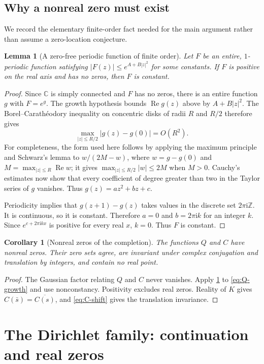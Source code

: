 \documentclass[11pt,a4paper]{article}
\numberwithin{equation}{section}
\newtheorem{lemma}[lemma]{Lemma}
\newtheorem{corollary}[corollary]{Corollary}
\theoremstyle{definition}
\theoremstyle{remark}
\newcommand{\C}{\mathbb C}
\newcommand{\Z}{\mathbb Z}
\newcommand{\ii}{\mathrm i}
\newcommand{\Rea}{\operatorname{Re}}
\newcommand{\abs}[1]{\left|#1\right|}
\begin{document}
\subsection{Why a nonreal zero must exist}
We record the elementary finite-order fact needed for the main
argument rather than assume a zero-location conjecture.

\begin{lemma}[A zero-free periodic function of finite order]
\label{lem:periodic-zero}
Let $F$ be an entire, $1$-periodic function satisfying
$\abs{F(z)}\le e^{A+B\abs z^2}$ for some constants. If $F$ is
positive on the real axis and has no zeros, then $F$ is constant.
\end{lemma}
\begin{proof}
Since $\C$ is simply connected and $F$ has no zeros, there is an
entire function $g$ with $F=e^g$. The growth hypothesis bounds
$\Rea g(z)$ above by $A+B\abs z^2$. The Borel--Carath\'eodory
inequality on concentric disks of radii $R$ and $R/2$ therefore gives
\[
 \max_{\abs z\le R/2}\abs{g(z)-g(0)}=O(R^2).
\]
For completeness, the form used here follows by applying the maximum
principle and Schwarz's lemma to
$w/(2M-w)$, where $w=g-g(0)$ and
$M=\max_{\abs z\le R}\Rea w$; it gives
$\max_{\abs z\le R/2}\abs w\le2M$ when $M>0$.
Cauchy's estimates now show that every coefficient of degree greater
than two in the Taylor series of $g$ vanishes. Thus
$g(z)=az^2+bz+c$.

Periodicity implies that $g(z+1)-g(z)$ takes values in the discrete
set $2\pi\ii\Z$. It is continuous, so it is constant. Therefore
$a=0$ and $b=2\pi\ii k$ for an integer $k$. Since
$e^{c+2\pi\ii kx}$ is positive for every real $x$, $k=0$.
Thus $F$ is constant.
\end{proof}

\begin{corollary}[Nonreal zeros of the completion]
\label{cor:C-zeros}
The functions $Q$ and $C$ have nonreal zeros. Their zero sets agree,
are invariant under complex conjugation and translation by integers,
and contain no real point.
\end{corollary}
\begin{proof}
The Gaussian factor relating $Q$ and $C$ never vanishes. Apply
\cref{lem:periodic-zero} to \cref{eq:Q-growth} and use nonconstancy.
Positivity excludes real zeros. Reality of $K$ gives
$C(\bar s)=\overline{C(s)}$, and \cref{eq:C-shift} gives the
translation invariance.
\end{proof}

\section{The Dirichlet family: continuation and real zeros}
\label{sec:dirichlet}
\end{document}

